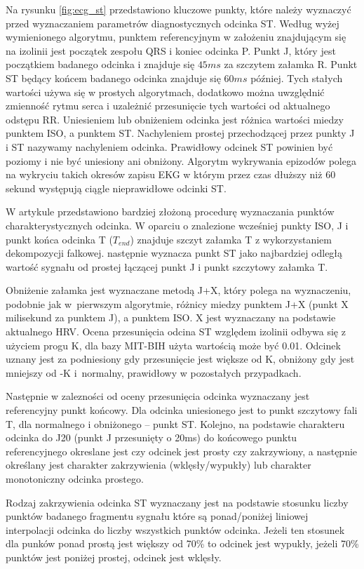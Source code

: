 \documentclass[a4paper, 11pt]{article}
\begin{document}
Na rysunku \ref{fig:ecg_st} przedstawiono kluczowe punkty, które należy
wyznaczyć przed wyznaczaniem parametrów diagnostycznych odcinka ST. Według
wyżej wymienionego algorytmu, punktem referencyjnym w założeniu znajdującym się
na izolinii jest początek zespołu QRS i koniec odcinka P. Punkt J, który jest
początkiem badanego odcinka i znajduje się $45ms$ za szczytem załamka R. Punkt
ST będący końcem badanego odcinka znajduje się $60ms$ później. Tych stałych
wartości używa się w prostych algorytmach, dodatkowo można uwzględnić zmienność
rytmu serca i uzależnić przesunięcie tych wartości od aktualnego odstępu RR.
Uniesieniem lub obniżeniem odcinka jest różnica wartości miedzy punktem ISO, a
punktem ST. Nachyleniem prostej przechodzącej przez punkty J i ST nazywamy
nachyleniem odcinka. Prawidłowy odcinek ST powinien być poziomy i nie być
uniesiony ani obniżony. Algorytm wykrywania epizodów polega na wykryciu takich
okresów zapisu EKG w którym przez czas dłuższy niż 60 sekund występują ciągle
nieprawidłowe odcinki ST.

W artykule \cite{SHEN1} przedstawiono bardziej złożoną procedurę wyznaczania
punktów charakterystycznych odcinka. W oparciu o znalezione wcześniej punkty
ISO, J i punkt końca odcinka T ($T_{end}$) znajduje szczyt załamka T z
wykorzystaniem dekompozycji falkowej. następnie wyznacza punkt ST jako
najbardziej odległą wartość sygnału od prostej łączącej punkt J i punkt
szczytowy załamka T.

Obniżenie załamka jest wyznaczane metodą J+X, który polega na wyznaczeniu,
podobnie jak w~pierwszym algorytmie, różnicy miedzy punktem J+X (punkt X
milisekund za punktem J), a punktem ISO. X jest wyznaczany na podstawie
aktualnego HRV. Ocena przesunięcia odcina ST względem izolinii odbywa się z
użyciem progu K, dla bazy MIT-BIH użyta wartością może być 0.01. Odcinek uznany
jest za podniesiony gdy przesunięcie jest większe od K, obniżony gdy jest
mniejszy od -K i~normalny, prawidłowy w pozostałych przypadkach.

Następnie w zalezności od oceny przesunięcia odcinka wyznaczany jest
referencyjny punkt końcowy. Dla odcinka uniesionego jest to punkt szczytowy
fali T, dla normalnego i obniżonego -- punkt ST. Kolejno, na podstawie
charakteru odcinka do J20 (punkt J przesunięty o 20ms) do końcowego punktu
referencyjnego okreslane jest czy odcinek jest prosty czy zakrzywiony, a
następnie określany jest charakter zakrzywienia (wklęsły/wypukły) lub charakter
monotoniczny odcinka prostego.

Rodzaj zakrzywienia odcinka ST wyznaczany jest na podstawie stosunku liczby
punktów badanego fragmentu sygnału które są ponad/poniżej liniowej interpolacji
odcinka do liczby wszystkich punktów odcinka. Jeżeli ten stosunek dla punków
ponad prostą jest większy od 70\% to odcinek jest wypukły, jeżeli 70\% punktów
jest poniżej prostej, odcinek jest wklęsły.
\end{document}
